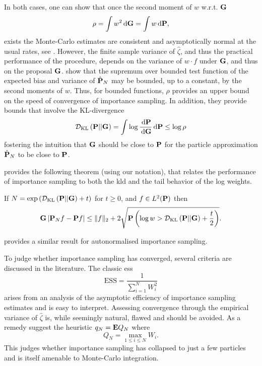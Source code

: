 In both cases, one can show that once the second moment of $w$ w.r.t. $\G$ 
$$
\rho = \int w^{2}\d\G = \int w \d \P,
$$
exists the Monte-Carlo estimates are consistent and asymptotically normal at the usual rates, see \cite[Chapter 8]{Chopin2020Introduction}. 
However, the finite sample variance of $\hat\zeta$, and thus the practical performance of the procedure, depends on the variance of $w\cdot f$ under $\G$, and thus on the proposal $\G$. \cite{Agapiou2017Importance} show that the supremum over bounded test function of the expected bias and variance of $\hat \P_N$ may be bounded, up to a constant, by the second moments of $w$. Thus, for bounded functions, $\rho$ provides an upper bound on the speed of convergence of importance sampling. In addition, they provide bounds that involve the KL-divergence 
$$
\Dkl{\P}{\G} = \int \log \frac{\d \P}{\d \G} \d \P \leq \log \rho
$$
fostering the intuition that $\G$ should be close to $\P$ for the particle approximation $\hat\P_{N}$ to be close to $\P$.

\cite{Chatterjee2018Sample} provides the following theorem (using our notation), that relates the performance of importance sampling to both the \gls{kld} and the tail behavior of the log weights.
\begin{theorem}
    \label{thm:chatterje2018Thm1}
    If $N = \exp \left( \Dkl{\P}{\G} + t \right)$ for $ t\geq 0$, and $f \in L^{2}(\P)$ then
    $$
        \G \left\lvert \P_{N} f - \P f \right\rvert \leq \lVert f \rVert_{2} + 2 \sqrt{ \P \left( \log w > \Dkl{\P}{\G} + \frac{t}{2} \right)}.
    $$
\end{theorem}
\citep[Theorem 1.2]{Chatterjee2018Sample} provides a similar result for autonormalised importance sampling.

To judge whether importance sampling has converged, several criteria are discussed in the literature. The classic \gls{ess}\cite{Kong1994Sequential} 
$$
\text{ESS} = \frac{1}{\sum_{i = 1}^N W^{2}_{i}}
$$
arises from an analysis of the asymptotic efficiency of importance sampling estimates and is easy to interpret. Assessing convergence through the empirical variance of $\hat \zeta$ is, while seemingly natural, flawed \cite{Chatterjee2018Sample}  and should be avoided. As a remedy \cite{Chatterjee2018Sample} suggest the heuristic $q_{N} = \E Q_{N}$ where
$$
Q_{N} = \max_{1\leq i\leq N} W_{i}.
$$
This judges whether importance sampling has collapsed to just a few particles and is itself amenable to Monte-Carlo integration.

